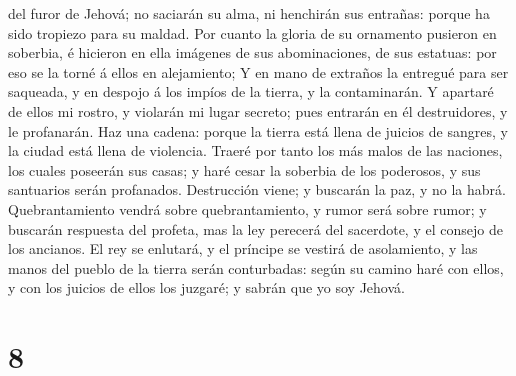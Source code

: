 del furor de Jehová; no saciarán su alma, ni henchirán sus entrañas:
porque ha sido tropiezo para su maldad.  Por cuanto la
gloria de su ornamento pusieron en soberbia, é hicieron en ella imágenes
de sus abominaciones, de sus estatuas: por eso se la torné á ellos en
alejamiento;  Y en mano de extraños la entregué para ser
saqueada, y en despojo á los impíos de la tierra, y la contaminarán.
 Y apartaré de ellos mi rostro, y violarán mi lugar
secreto; pues entrarán en él destruidores, y le profanarán.
 Haz una cadena: porque la tierra está llena de juicios
de sangres, y la ciudad está llena de violencia.  Traeré
por tanto los más malos de las naciones, los cuales poseerán sus casas;
y haré cesar la soberbia de los poderosos, y sus santuarios serán
profanados.  Destrucción viene; y buscarán la paz, y no
la habrá.  Quebrantamiento vendrá sobre quebrantamiento,
y rumor será sobre rumor; y buscarán respuesta del profeta, mas la ley
perecerá del sacerdote, y el consejo de los ancianos.  El
rey se enlutará, y el príncipe se vestirá de asolamiento, y las manos
del pueblo de la tierra serán conturbadas: según su camino haré con
ellos, y con los juicios de ellos los juzgaré; y sabrán que yo soy
Jehová.

\hypertarget{section-7}{%
\section{8}\label{section-7}}

